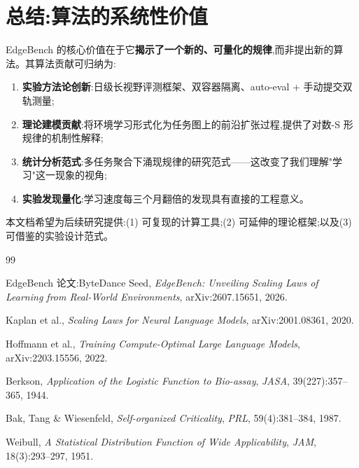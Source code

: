 \documentclass[a4paper,11pt]{article}
\begin{document}
\section{总结:算法的系统性价值}

EdgeBench 的核心价值在于它\textbf{揭示了一个新的、可量化的规律},而非提出新的算法。其算法贡献可归纳为:

\begin{enumerate}
    \item \textbf{实验方法论创新}:日级长视野评测框架、双容器隔离、auto-eval + 手动提交双轨测量;
    \item \textbf{理论建模贡献}:将环境学习形式化为任务图上的前沿扩张过程,提供了对数-S 形规律的机制性解释;
    \item \textbf{统计分析范式}:多任务聚合下涌现规律的研究范式——这改变了我们理解"学习"这一现象的视角;
    \item \textbf{实验发现量化}:学习速度每三个月翻倍的发现具有直接的工程意义。
\end{enumerate}

本文档希望为后续研究提供:(1) 可复现的计算工具;(2) 可延伸的理论框架;以及(3) 可借鉴的实验设计范式。

\vfill
\begin{thebibliography}{99}

\item EdgeBench 论文:ByteDance Seed, \textit{EdgeBench: Unveiling Scaling Laws of Learning from Real-World Environments}, arXiv:2607.15651, 2026.

\item Kaplan et al., \textit{Scaling Laws for Neural Language Models}, arXiv:2001.08361, 2020.

\item Hoffmann et al., \textit{Training Compute-Optimal Large Language Models}, arXiv:2203.15556, 2022.

\item Berkson, \textit{Application of the Logistic Function to Bio-assay}, \textit{JASA}, 39(227):357--365, 1944.

\item Bak, Tang \& Wiesenfeld, \textit{Self-organized Criticality}, \textit{PRL}, 59(4):381--384, 1987.

\item Weibull, \textit{A Statistical Distribution Function of Wide Applicability}, \textit{JAM}, 18(3):293--297, 1951.

\end{thebibliography}
\end{document}
